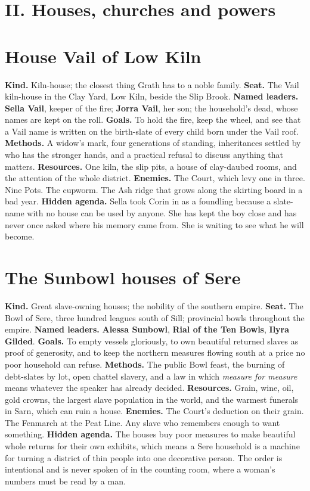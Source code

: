 \documentclass{design/chronicle}
\begin{document}
\CRrule

\section*{II. Houses, churches and powers}

\section*{House Vail of Low Kiln}

\textbf{Kind.} Kiln-house; the closest thing Grath has to a noble family. \textbf{Seat.} The Vail kiln-house in the Clay Yard, Low Kiln, beside the Slip Brook. \textbf{Named leaders.} \textbf{Sella Vail}, keeper of the fire; \textbf{Jorra Vail}, her son; the household’s dead, whose names are kept on the roll. \textbf{Goals.} To hold the fire, keep the wheel, and see that a Vail name is written on the birth-slate of every child born under the Vail roof. \textbf{Methods.} A widow’s mark, four generations of standing, inheritances settled by who has the stronger hands, and a practical refusal to discuss anything that matters. \textbf{Resources.} One kiln, the slip pits, a house of clay-daubed rooms, and the attention of the whole district. \textbf{Enemies.} The Court, which levy one in three. Nine Pots. The cupworm. The Ash ridge that grows along the skirting board in a bad year. \textbf{Hidden agenda.} Sella took Corin in as a foundling because a slate-name with no house can be used by anyone. She has kept the boy close and has never once asked where his memory came from. She is waiting to see what he will become.

\section*{The Sunbowl houses of Sere}

\textbf{Kind.} Great slave-owning houses; the nobility of the southern empire. \textbf{Seat.} The Bowl of Sere, three hundred leagues south of Sill; provincial bowls throughout the empire. \textbf{Named leaders.} \textbf{Alessa Sunbowl}, \textbf{Rial of the Ten Bowls}, \textbf{Ilyra Gilded}. \textbf{Goals.} To empty vessels gloriously, to own beautiful returned slaves as proof of generosity, and to keep the northern measures flowing south at a price no poor household can refuse. \textbf{Methods.} The public Bowl feast, the burning of debt-slates by lot, open chattel slavery, and a law in which \emph{measure for measure} means whatever the speaker has already decided. \textbf{Resources.} Grain, wine, oil, gold crowns, the largest slave population in the world, and the warmest funerals in Sarn, which can ruin a house. \textbf{Enemies.} The Court’s deduction on their grain. The Fenmarch at the Peat Line. Any slave who remembers enough to want something. \textbf{Hidden agenda.} The houses buy poor measures to make beautiful whole returns for their own exhibits, which means a Sere household is a machine for turning a district of thin people into one decorative person. The order is intentional and is never spoken of in the counting room, where a woman’s numbers must be read by a man.
\end{document}
